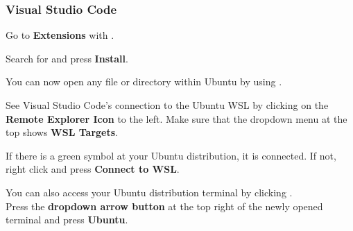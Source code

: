 \subsubsection{Visual Studio Code}


Go to \textbf{Extensions} with .

Search for  and press \textbf{Install}.

You can now open any file or directory within Ubuntu by using .

See Visual Studio Code's connection to the Ubuntu WSL by clicking on the \textbf{Remote Explorer Icon} to the left. Make sure that the dropdown menu at the top shows \textbf{WSL Targets}.

If there is a green symbol at your Ubuntu distribution, it is connected. If not,\\right click and press \textbf{Connect to WSL}.

You can also access your Ubuntu distribution terminal by clicking .\\
Press the \textbf{dropdown arrow button} at the top right of the newly opened terminal and press \textbf{Ubuntu}.
